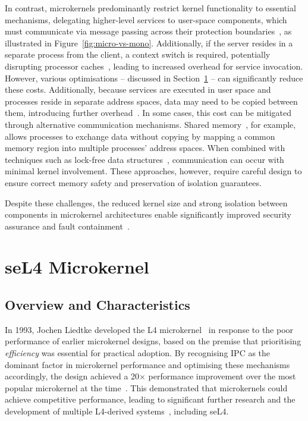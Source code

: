 In contrast, microkernels predominantly restrict kernel functionality to essential mechanisms, delegating higher-level services to user-space components, which must communicate via message passing across their protection boundaries~\cite{silberschatz2013operating}, as illustrated in Figure~\ref{fig:micro-vs-mono}. Additionally, if the server resides in a separate process from the client, a context switch is required, potentially disrupting processor caches~\cite{mogul_effect_1991}, leading to increased overhead for service invocation. However, various optimisations – discussed in Section~\ref{sec:sel4} – can significantly reduce these costs.
\newpage
Additionally, because services are executed in user space and processes reside in separate address spaces, data may need to be copied between them, introducing further overhead~\cite{liu2021scale}. In some cases, this cost can be mitigated through alternative communication mechanisms. Shared memory~\cite{silberschatz2013operating}, for example, allows processes to exchange data without copying by mapping a common memory region into multiple processes' address spaces. When combined with techniques such as lock-free data structures~\cite{barnes_method_1993}, communication can occur with minimal kernel involvement. These approaches, however, require careful design to ensure correct memory safety and preservation of isolation guarantees.

Despite these challenges, the reduced kernel size and strong isolation between components in microkernel architectures enable significantly improved security assurance and fault containment~\cite{biggs_jury_2018}.

\section{seL4 Microkernel}\label{sec:sel4}

\subsection{Overview and Characteristics}
In 1993, Jochen Liedtke developed the L4 microkernel~\cite{liedtke_improving_1993} in response to the poor performance of earlier microkernel designs, based on the premise that prioritising \textit{efficiency} was essential for practical adoption. By recognising IPC as the dominant factor in microkernel performance and optimising these mechanisms accordingly, the design achieved a 20× performance improvement over the most popular microkernel at the time~\cite{liedtke_improving_1993}. This demonstrated that microkernels could achieve competitive performance, leading to significant further research and the development of multiple L4-derived systems~\cite{heiser_l4_2016}, including seL4.

